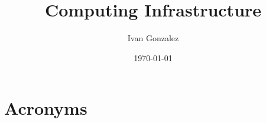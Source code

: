 \documentclass[PMO,authoryear,toc]{lsstdoc}
\title{Computing Infrastructure}
\author{%
Ivan Gonzalez
}
\date{\today}
\begin{document}
\maketitle





\appendix
\renewcommand{\refname}{} %


\newpage
\section{Acronyms} \label{sec:acronyms}

\end{document}

